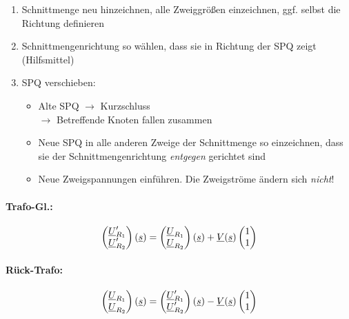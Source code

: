 \begin{minipage}{0.5\textwidth}
\begin{enumerate}[label=\arabic*.)]
  \item
    Schnittmenge neu hinzeichnen, alle Zweiggrößen einzeichnen,
    ggf. selbst die Richtung definieren
  \item
    Schnittmengenrichtung so wählen, dass sie in Richtung der SPQ zeigt (Hilfsmittel)
  \item
    SPQ verschieben:
    \begin{itemize}
      \item Alte SPQ $\to$ Kurzschluss\\
        $\to$ Betreffende Knoten fallen zusammen
      \item Neue SPQ in alle anderen Zweige der Schnittmenge so einzeichnen, dass
        sie der Schnittmengenrichtung \emph{entgegen} gerichtet sind
      \item Neue Zweigspannungen einführen.
        Die Zweigströme ändern sich \emph{nicht}!
    \end{itemize}
\end{enumerate}
\end{minipage}

\paragraph{Trafo-Gl.:}
\[\begin{pmatrix}
    \underline{U}_{R_1}' \\
    \underline{U}_{R_2}'
  \end{pmatrix}(\underline{s})
  = \begin{pmatrix}
      \underline{U}_{R_1} \\
      \underline{U}_{R_2}
    \end{pmatrix}(\underline{s})
    +\underline{V}(\underline{s})
    \begin{pmatrix}1\\1\end{pmatrix}
\]

\paragraph{Rück-Trafo:}
\[\begin{pmatrix}
    \underline{U}_{R_1} \\
    \underline{U}_{R_2}
  \end{pmatrix}(\underline{s})
  = \begin{pmatrix}
      \underline{U}_{R_1}' \\
      \underline{U}_{R_2}'
    \end{pmatrix}(\underline{s})
    -\underline{V}(\underline{s})
    \begin{pmatrix}1\\1\end{pmatrix}\]


